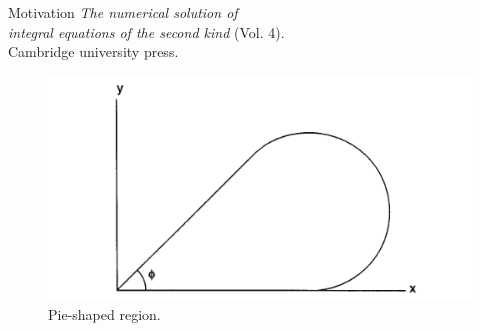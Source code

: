 \documentclass{beamer}
\begin{document}
\begin{frame}[t,fragile]{Motivation}
    \emph{The numerical solution of \\
  \hspace{10pt}
    integral equations of the second kind} (Vol. 4). \\
  \hspace{10pt}
    Cambridge university press.
\begin{figure}
    \centering
    \vspace{-55pt}
     \includegraphics[width=.3\textwidth]{pie.png}
    \vspace{-8pt}
    \caption{\footnotesize Pie-shaped region.}
\end{figure}
\end{frame}
\end{document}
